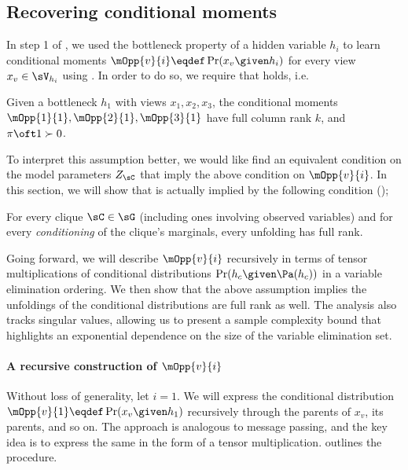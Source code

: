 \subsection{Recovering conditional moments}
\label{app:assumption-proof}

In step 1 of \LearnMarginals, we used the bottleneck property of a hidden
  variable $h_i$ to learn conditional moments $\mOpp{v}{i} \eqdef
  \Pr(x_v \given h_i)$ for every view $x_v \in \sV_{h_i}$ using
  \TensorFactorize. 
In order to do so, we require that  holds, i.e.
\begin{assumption*}
  Given a bottleneck $h_1$ with views $x_1, x_2, x_3$, the conditional
  moments $\mOpp{1}{1}, \mOpp{2}{1}, \mOpp{3}{1}$ have full column rank
  $k$, and $\pi\oft 1 \succ 0$.
\end{assumption*}

To interpret this assumption better, we would like find an equivalent
condition on the model parameters $Z_\sC$ that imply the above condition
on $\mOpp{v}{i}$. In this section, we will show that
 is actually implied by the following condition
();
\begin{assumption*}
For every clique $\sC \in \sG$ (including ones involving observed
  variables) and for every {\em conditioning} of the clique's marginals,
  every unfolding has full rank. 
\end{assumption*}

Going forward, we will describe $\mOpp{v}{i}$ recursively in terms of
  tensor multiplications of conditional distributions $\Pr(h_c \given
  \Pa(h_c))$ in a variable elimination ordering.
We then show that the above assumption implies the unfoldings of the
  conditional distributions are full rank as well.
The analysis also tracks singular values, allowing us to present
  a sample complexity bound that highlights an exponential dependence on
  the size of the variable elimination set.  

\paragraph{A recursive construction of $\mOpp{v}{i}$}

Without loss of generality, let $i = 1$. We will express the conditional
distribution $\mOpp{v}{1} \eqdef \Pr(x_v \given h_1)$ recursively through the
parents of $x_v$, its parents, and so on. The approach is analogous to
message passing, and the key idea is to express the same in the form of
a tensor multiplication.  outlines the
procedure.

